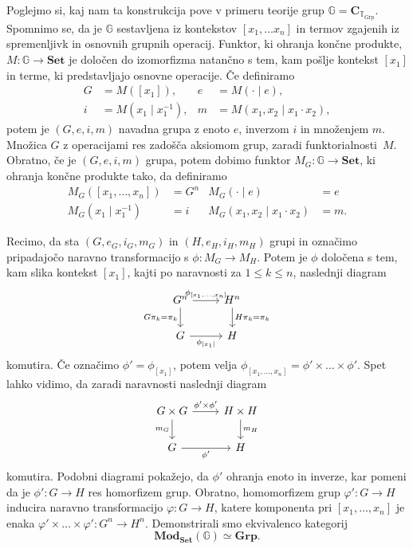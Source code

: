 \documentclass[../kategoricna_logika.tex]{subfiles}
\begin{document}
\begin{primer}
  Poglejmo si, kaj nam ta konstrukcija pove v primeru teorije grup
  $\mathbb{G} = \mathbf{C}_{\mathbb{T}_{\mathrm{Grp}}}$. Spomnimo se,
  da je $\mathbb{G}$ sestavljena iz kontekstov $[x_1, \ldots x_n]$ in
  termov zgajenih iz spremenljivk in osnovnih grupnih operacij.
  Funktor, ki ohranja končne produkte, $M : \mathbb{G} \to \mathbf{Set}$
  je določen do izomorfizma natančno s tem, kam pošlje kontekst $[x_1]$
  in terme, ki predstavljajo osnovne operacije. Če definiramo
\begin{align*}
  G &= M([x_1]), & e &= M(\cdot \mid e), \\
  i &= M(x_1 \mid x_1^{-1}), & m &= M(x_1,x_2 \mid x_1 \cdot x_2),
\end{align*}
potem je $(G,e,i,m)$ navadna grupa z enoto $e$, inverzom $i$ in
množenjem $m$. Množica $G$ z operacijami res zadošča aksiomom
grup, zaradi funktorialnosti~$M$. Obratno, če je $(G,e,i,m)$ grupa,
potem dobimo funktor $M_{G} : \mathbb{G} \to \mathbf{Set}$,
ki ohranja končne produkte tako, da definiramo
\begin{align*}
  M_{G}([x_1, \ldots, x_n]) &= G^n & M_{G}(\cdot \mid e) &= e \\
  M_{G}(x_1 \mid x_1^{-1}) &= i & M_{G}(x_1, x_2 \mid x_1 \cdot x_2) &= m.
\end{align*}

Recimo, da sta $(G,e_{G}, i_{G}, m_{G})$ in $(H, e_H, i_H, m_H)$ grupi
in označimo pripadajočo naravno transformacijo s ${\phi : M_{G} \to M_H}$.
Potem je $\phi$ določena s tem, kam slika kontekst $[x_1]$,
kajti po naravnosti za $1 \leq k \leq n$, naslednji diagram
\begin{equation*}
\begin{tikzcd}\label{primer:grupe-kot-funktorji}
  G^n \ar[d, "G\pi_k = \pi_k"'] \ar[r, "\phi_{[x_1, \ldots, x_n]}"] & H^n \ar[d, "H\pi_k = \pi_k"] \\
  G \ar[r, "\phi_{[x_1]}"'] & H
\end{tikzcd}
\end{equation*}
komutira. Če označimo $\phi' = \phi_{[x_1]}$, potem velja
$\phi_{[x_1, \ldots, x_n]} = \phi' \times \ldots \times \phi'$.
Spet lahko vidimo, da zaradi naravnosti naslednji diagram
\begin{equation*}
\begin{tikzcd}\label{sec:modeli-kot-funtorji-3}
  G \times G \ar[d, "m_{G}"'] \ar[r, "\phi' \times \phi'"] & H \times H \ar[d, "m_H"] \\
  G \ar[r, "\phi'"'] & H
\end{tikzcd}
\end{equation*}
komutira. Podobni diagrami pokažejo, da $\phi'$ ohranja enoto in
inverze, kar pomeni da je $\phi' : G \to H$ res homorfizem grup.
Obratno, homomorfizem grup ${\varphi' : G \to H}$ inducira naravno
transformacijo $\varphi : G \to H$, katere komponenta pri
$[x_1, \ldots, x_n]$ je enaka $\varphi' \times \ldots \times \varphi' : G^n \to H^n$.
Demonstrirali smo ekvivalenco kategorij
\[ \mathbf{Mod}_{\mathbf{Set}}(\mathbb{G}) \simeq \mathbf{Grp}. \]
\end{primer}
\end{document}
